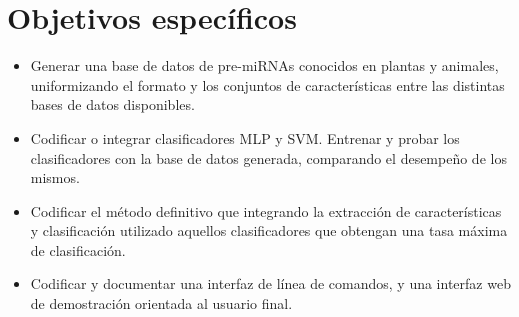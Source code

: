\section{Objetivos específicos}

\begin{itemize}
\item Generar una base de datos de pre-miRNAs conocidos en plantas y
  animales, uniformizando el formato y los conjuntos de
  características entre las distintas bases de datos disponibles.
\item Codificar o integrar clasificadores MLP y SVM. Entrenar y probar
  los clasificadores con la base de datos generada, comparando el
  desempeño de los mismos.
\item Codificar el método definitivo que integrando la extracción de
  características y clasificación utilizado aquellos clasificadores
  que obtengan una tasa máxima de clasificación.
\item Codificar y documentar una interfaz de línea de comandos, y una
  interfaz web de demostración orientada al usuario final.
\end{itemize}